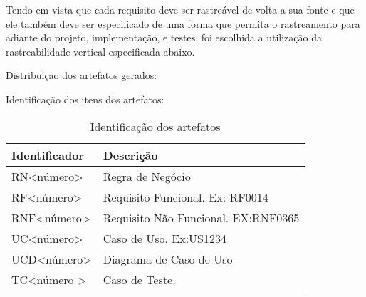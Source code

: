 Tendo em vista que cada requisito deve ser rastreável de volta a sua fonte e que ele também deve ser especificado de uma forma que permita o rastreamento para adiante do projeto, implementação, e testes, foi escolhida a utilização da rastreabilidade vertical especificada abaixo.

Distribuiçao dos artefatos gerados:

Identificação dos itens dos artefatos:

\begin{table}[]
\centering
\label{artefacts-identifier}
\begin{tabular}{|l|l|}
\hline
\textbf{Identificador}         & \textbf{Descrição}                  \\ \hline
RN\textless número\textgreater  & Regra de Negócio                    \\ \hline
RF\textless número\textgreater  & Requisito Funcional. Ex: RF0014     \\ \hline
RNF\textless número\textgreater & Requisito Não Funcional. EX:RNF0365 \\ \hline
UC\textless número\textgreater  & Caso de Uso. Ex:US1234              \\ \hline
UCD\textless número\textgreater & Diagrama de Caso de Uso             \\ \hline
TC\textless número \textgreater  & Caso de Teste.                     \\ \hline
\end{tabular}
\caption{Identificação dos artefatos}
\end{table}

